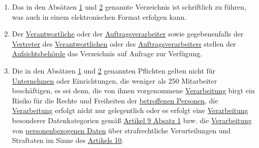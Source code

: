 \begin{enumerate}
\begin{enumerate}
  \end{enumerate}

  \item Das in den Absätzen \hyperref[itm:30-1]{1} und \hyperref[itm:30-2]{2} genannte Verzeichnis ist schriftlich zu
   führen, was auch in einem elektronischen Format erfolgen kann.%
  \label{itm:30-3}

  \item Der \hyperref[itm:04-7]{Verantwortliche} oder der \hyperref[itm:04-8]{Auftragsverarbeiter} sowie gegebenenfalls
   der \hyperref[itm:04-17]{Vertreter} des \hyperref[itm:04-7]{Verantwortlichen} oder des \hyperref[itm:04-8]
   {Auftragsverarbeiters} stellen der \hyperref[itm:04-21]{Aufsichtsbehörde} das Verzeichnis auf Anfrage zur
   Verfügung.%
  \label{itm:30-4}

  \item Die in den Absätzen \hyperref[itm:30-1]{1} und \hyperref[itm:30-2]{2} genannten Pflichten gelten nicht für
   \hyperref[itm:04-18]{Unternehmen} oder Einrichtungen, die weniger als 250 Mitarbeiter beschäftigen, es sei denn, die
    von ihnen vorgenommene \hyperref[itm:04-2]{Verarbeitung} birgt ein Risiko für die Rechte und Freiheiten
    der \hyperref[itm:04-1]{betroffenen Personen}, die \hyperref[itm:04-2]{Verarbeitung} erfolgt nicht nur gelegentlich
    oder es erfolgt eine \hyperref[itm:04-2]{Verarbeitung} besonderer Datenkategorien gemäß \hyperref[itm:09-1]
    {Artikel 9 Absatz 1} bzw. die \hyperref[itm:04-2]{Verarbeitung} von \hyperref[itm:04-1]{personenbezogenen Daten}
    über strafrechtliche Verurteilungen und Straftaten im Sinne des \hyperref[ch:10]{Artikels 10}.%


  \label{itm:30-5}

\end{enumerate}



